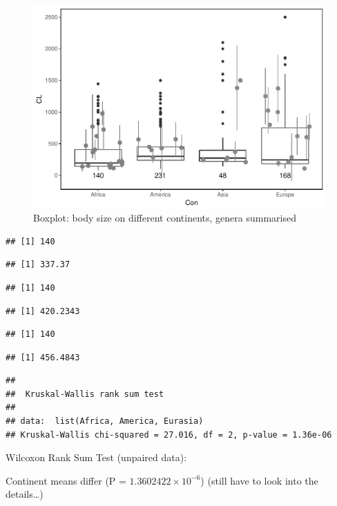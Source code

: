 \documentclass[]{article}
\begin{document}
\begin{figure}[htbp]
\centering
\includegraphics{MA_JJ_files/figure-latex/Boxplot body size split into continents-1.pdf}
\caption{Boxplot: body size on different continents, genera summarised}
\end{figure}

\begin{verbatim}
## [1] 140
\end{verbatim}

\begin{verbatim}
## [1] 337.37
\end{verbatim}

\begin{verbatim}
## [1] 140
\end{verbatim}

\begin{verbatim}
## [1] 420.2343
\end{verbatim}

\begin{verbatim}
## [1] 140
\end{verbatim}

\begin{verbatim}
## [1] 456.4843
\end{verbatim}

\begin{verbatim}
## 
##  Kruskal-Wallis rank sum test
## 
## data:  list(Africa, America, Eurasia)
## Kruskal-Wallis chi-squared = 27.016, df = 2, p-value = 1.36e-06
\end{verbatim}

Wilcoxon Rank Sum Test (unpaired data):

Continent means differ (P = \(1.3602422\times 10^{-6}\)) (still have to
look into the details\ldots{})
\end{document}
